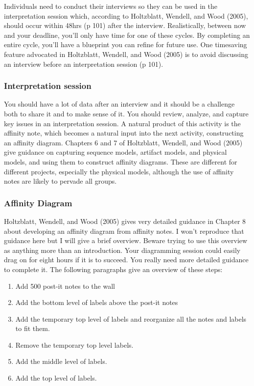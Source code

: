 Individuals need to conduct their interviews so they can be used in the
interpretation session which, according to Holtzblatt, Wendell, and Wood
(2005), should occur within 48hrs (p 101) after the interview.
Realistically, between now and your deadline, you'll only have time for
one of these cycles. By completing an entire cycle, you'll have a
blueprint you can refine for future use. One timesaving feature
advocated in Holtzblatt, Wendell, and Wood (2005) is to avoid discussing
an interview before an interpretation session (p 101).

\hypertarget{interpretation-session}{%
\subsubsection{Interpretation session}\label{interpretation-session}}

You should have a lot of data after an interview and it should be a
challenge both to share it and to make sense of it. You should review,
analyze, and capture key issues in an interpretation session. A natural
product of this activity is the affinity note, which becomes a natural
input into the next activity, constructing an affinity diagram. Chapters
6 and 7 of Holtzblatt, Wendell, and Wood (2005) give guidance on
capturing sequence models, artifact models, and physical models, and
using them to construct affinity diagrams. These are different for
different projects, especially the physical models, although the use of
affinity notes are likely to pervade all groups.

\hypertarget{affinity-diagram}{%
\subsubsection{Affinity Diagram}\label{affinity-diagram}}

Holtzblatt, Wendell, and Wood (2005) gives very detailed guidance in
Chapter 8 about developing an affinity diagram from affinity notes. I
won't reproduce that guidance here but I will give a brief overview.
Beware trying to use this overview as anything more than an
introduction. Your diagramming session could easily drag on for eight
hours if it is to succeed. You really need more detailed guidance to
complete it. The following paragraphs give an overview of these steps:

\begin{enumerate}
\def\labelenumi{\arabic{enumi}.}
\tightlist
\item
  Add 500 post-it notes to the wall
\item
  Add the bottom level of labels above the post-it notes
\item
  Add the temporary top level of labels and reorganize all the notes and
  labels to fit them.
\item
  Remove the temporary top level labels.
\item
  Add the middle level of labels.
\item
  Add the top level of labels.
\end{enumerate}

